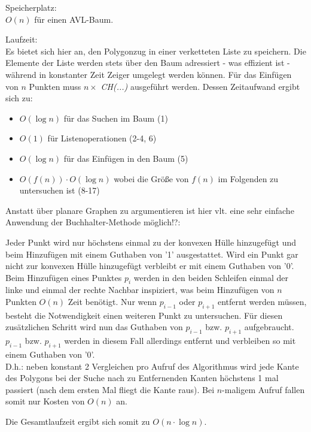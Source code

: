 \documentclass[a4paper, titlepage=false, parskip=full-, 10pt]{scrartcl}
\begin{document}
Speicherplatz:\\
$O(n)$ für einen AVL-Baum.

Laufzeit:\\
Es bietet sich hier an, den Polygonzug in einer verketteten Liste zu speichern. Die Elemente der Liste werden stets über den Baum adressiert - was effizient ist - während in konstanter Zeit Zeiger umgelegt werden können. Für das Einfügen von $n$ Punkten muss $n\times$ \emph{CH(...)} ausgeführt werden. Dessen Zeitaufwand ergibt sich zu:
\begin{itemize}
\item $O(\log n)$ für das Suchen im Baum (1)
\item $O(1)$ für Listenoperationen (2-4, 6)
\item $O(\log n)$ für das Einfügen in den Baum (5)
\item $O(f(n))\cdot O(\log n)$ wobei die Größe von $f(n)$ im Folgenden zu untersuchen ist (8-17)
\end{itemize}

Anstatt über planare Graphen zu argumentieren ist hier vlt. eine sehr einfache Anwendung der Buchhalter-Methode möglich!?:

Jeder Punkt wird nur höchstens einmal zu der konvexen Hülle hinzugefügt und beim Hinzufügen mit einem Guthaben von '1' ausgestattet. Wird ein Punkt gar nicht zur konvexen Hülle hinzugefügt verbleibt er mit einem Guthaben von '0'. Beim Hinzufügen eines Punktes $p_i$ werden in den beiden Schleifen einmal der linke und einmal der rechte Nachbar inspiziert, was beim Hinzufügen von $n$ Punkten $O(n)$ Zeit benötigt. Nur wenn $p_{i-1}$ oder $p_{i+1}$ entfernt werden müssen, besteht die Notwendigkeit einen weiteren Punkt zu untersuchen. Für diesen zusätzlichen Schritt wird nun das Guthaben von $p_{i-1}$ bzw. $p_{i+1}$ aufgebraucht. $p_{i-1}$ bzw. $p_{i+1}$ werden in diesem Fall allerdings entfernt und verbleiben so mit einem Guthaben von '0'.\\
D.h.: neben konstant 2 Vergleichen pro Aufruf des Algorithmus wird jede Kante des Polygons bei der Suche nach zu Entfernenden Kanten höchstens 1 mal passiert (nach dem ersten Mal fliegt die Kante raus). Bei $n$-maligem Aufruf fallen somit nur Kosten von $O(n)$ an.

Die Gesamtlaufzeit ergibt sich somit zu $O(n\cdot\log n)$.
\end{document}
